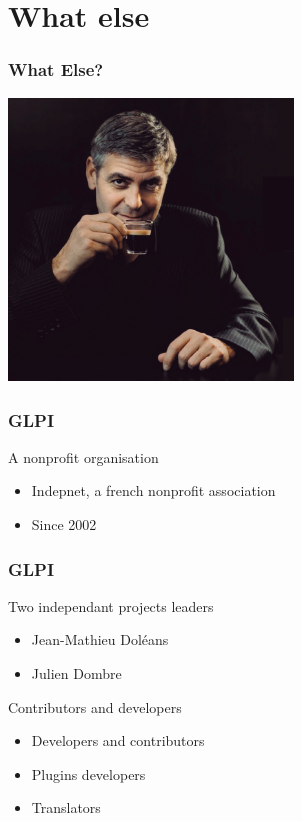 \documentclass{beamer}
\begin{document}
\section{What else}

\begin{frame}

    \frametitle{What Else?}


\includegraphics[height=7.5cm]{./pics/whatelse.jpg}

\end{frame}



\begin{frame}

    \frametitle{GLPI}

    \begin{block}{A nonprofit organisation}
        \begin{itemize}
            \item Indepnet, a french nonprofit association
            \item Since 2002
        \end{itemize}
    \end{block}

\end{frame}





\begin{frame}

    \frametitle{GLPI}

    \begin{block}{Two independant projects leaders}
        \begin{itemize}
            \item Jean-Mathieu Doléans
            \item Julien Dombre
        \end{itemize}
    \end{block}
\pause
    \begin{block}{Contributors and developers}
        \begin{itemize}
            \item Developers and contributors
            \item Plugins developers
            \item Translators
        \end{itemize}
    \end{block}

\end{frame}
\end{document}
